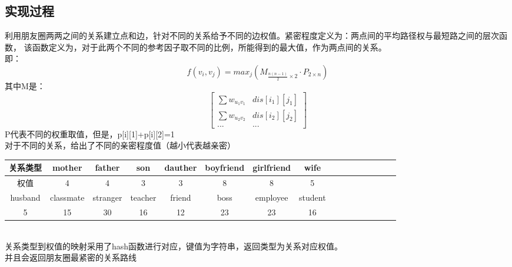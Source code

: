 \documentclass[UTF8,a4paper]{article}
\begin{document}
\subsection{实现过程}
利用朋友圈两两之间的关系建立点和边，针对不同的关系给予不同的边权值。紧密程度定义为：两点间的平均路径权与最短路之间的层次函数，
该函数定义为，对于此两个不同的参考因子取不同的比例，所能得到的最大值，作为两点间的关系。\\
即：
$$
f(v_i,v_j)=max_{j}  (M_{\frac{n(n-1)}{2}\times 2}\cdot P_{2\times n})
$$
其中M是：
$$
\begin{bmatrix}
    \sum w_{u_1v_1} & dis[i_1][j_1]\\
    \sum w_{u_2v_2} & dis[i_2][j_2]\\
    ... & ...
\end{bmatrix}
$$
P代表不同的权重取值，但是，p[i][1]+p[i][2]=1\\
对于不同的关系，给出了不同的亲密程度值（越小代表越亲密）\\[0.5cm]
\begin{tabular}{|c|c|c|c|c|c|c|c|c|c|c|c|c|c|c|c|}
关系类型 & mother&father&son&dauther&boyfriend&girlfriend&wife\\
\hline
权值 & 4 &4&3&3&8&8&5\\
\hline
husband&classmate&stranger&teacher&friend&boss&employee&student\\
\hline
5&15&30&16&12&23&23&16\\
\end{tabular}
\\[1cm]
关系类型到权值的映射采用了hash函数进行对应，键值为字符串，返回类型为关系对应权值。\\
并且会返回朋友圈最紧密的关系路线
\end{document}
